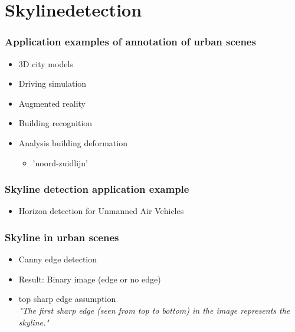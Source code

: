 \documentclass{beamer}
\begin{document}
\section{Skylinedetection}
\frame
{
	\frametitle{Application examples of annotation of urban scenes}
	\begin{itemize}
		\item  <+-| alert@+> 3D city models
		\item  <+-| alert@+> Driving simulation
		\item  <+-| alert@+> Augmented reality
		\item  <+-| alert@+> Building recognition
		\item  <+-| alert@+> Analysis building deformation
		\begin{itemize}
			\item  <+-| alert@+> 	'noord-zuidlijn'
		\end{itemize}
	\end{itemize}
}


\frame
{
	\frametitle{Skyline detection application example}
	\begin{itemize}
		\item  <+-| alert@+> Horizon detection for Unmanned Air Vehicles
	\end{itemize}
}

\frame
{
	\frametitle{Skyline in urban scenes}%
	\begin{itemize}
		\item  <+-| alert@+> Canny edge detection 
		\item  <+-| alert@+> Result: Binary image (edge or no edge)
		\item  <+-| alert@+> top sharp edge assumption\\
		\emph{"The first sharp edge (seen from top to bottom) in the image represents the skyline."}
	\end{itemize}
}
\end{document}
